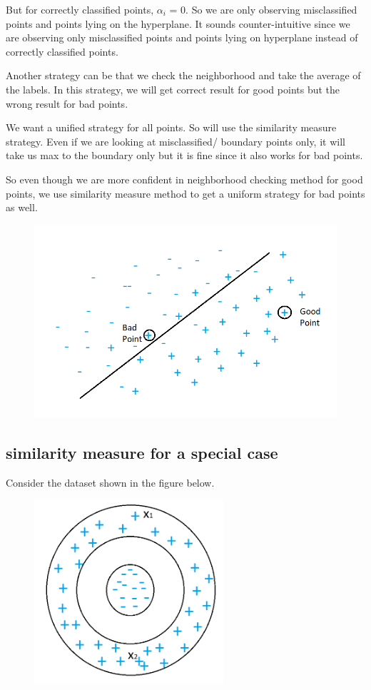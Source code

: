 \documentclass[12pt]{article}
\begin{document}
\par But for correctly classified points, $\alpha_i$ = 0. So we are only observing misclassified points and points lying on the hyperplane. It sounds counter-intuitive since we are observing only misclassified points and points lying on hyperplane instead of correctly classified points.
\par Another strategy can be that we check the neighborhood and take the average of the labels. In this strategy, we will get correct result for good points but the wrong result for bad points.
\par We want a unified strategy for all points. So will use the similarity measure strategy. Even if we are looking at misclassified/ boundary points only, it will take us max to the boundary only but it is fine since it also works for bad points. 
\par So even though we are more confident in neighborhood checking method for good points, we use similarity measure method to get a uniform strategy for bad points as well. 

\begin{figure}[htp]
    \centering
    \includegraphics[scale=0.55]{nh.png}
\end{figure}






\newpage
\subsection*{similarity measure for a special case}
Consider the dataset shown in the figure below.
 \begin{figure}[htp]
    \centering
    \includegraphics[width=7cm]{smsc.png}
\end{figure}
\end{document}
